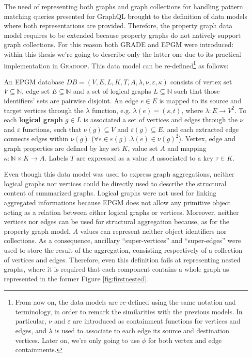 \label{php:EPGM}
The need of representing both graphs and graph collections for handling pattern matching queries presented for GraphQL \cite{He2007} brought to the definition of data models where both representations are provided. Therefore, the property graph data model requires to be extended because property graphs do not natively support graph collections. For this reason both GRADE \cite{GRAD,Ghrab2015} and EPGM \cite{apacheflink,JunghannsPR17} were introduced: within this thesis we're going to describe only the latter one due to its practical implementation in \textsc{Gradoop}. This data model can be re-defined\footnote{From now on, the data models are re-defined using the same notation and terminology, in order to remark the similarities with the previous models. In particular, $\nu$ and $\varepsilon$ are introduced as containment functions for vertices and edges, and $\lambda$ is used to associate to each edge its source and destination vertices. Later on, we're only going to use $\phi$ for both vertex and edge containments.} as follows:

\begin{definition}
	An EPGM database $DB = ( V, E, L, K, T, A,\lambda,\nu,\varepsilon, \kappa )$ consists of vertex set $V\subseteq \mathbb{N}$, edge set $E\subseteq \mathbb{N}$ and a set of logical graphs $L\subseteq \mathbb{N}$ such that those identifiers' sets are  pairwise disjoint. An edge $e\in E$ is mapped to its source and target vertices through the $\lambda$ function, e.g. $\lambda(e) = ( s,t )$, where $\lambda\colon E\to V^2$.  To each \textbf{logical graph} $g \in L$ is  associated a set of vertices and edges through the $\nu$ and $\varepsilon$ functions, such that $\nu(g)\subseteq V$ and $\varepsilon(g)\subseteq E$, and each extracted edge connects edges within $\nu(g)$ ($\forall e\in \varepsilon(g).\lambda(e)\in\nu(g)^2$). Vertex, edge and graph properties are defined by key set $K$, value set $A$ and mapping $\kappa : \mathbb{N} \times K \rightarrow A$. Labels $T$ are expressed as a value $A$ associated to a key $\tau\in K$.
\end{definition}

Even though this data model was  used to express graph aggregations,  neither logical graphs nor vertices could be directly used to describe the structural content of summarized graphs.  Logical graphs were not used for linking aggregated informations because EPGM does not allow any primitive object acting as a relation between either logical graphs or vertices. Moreover, neither vertices nor edges can be used for structural aggregation because, as for the property graph model, $A$ values can represent neither object identifiers nor collections. As a consequence, ancillary ``super-vertices'' and ``super-edges'' were used to store the result of the aggregation, consisting respectively of a collection of vertices and edges. Therefore, even this definition fails at representing nested graphs, where it is required that each component contains a whole graph as represented in the former Figure \vref{fig:firstnested}.